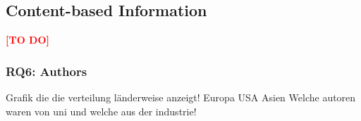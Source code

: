 
\subsection{Content-based Information}
\label{subsec:ContentBasedInformation}
\textcolor{red}{\textbf{[TO DO]}}


\clearpage
\subsubsection{RQ6: Authors}

Grafik die die verteilung länderweise anzeigt! Europa USA Asien
Welche autoren waren von uni und welche aus der industrie!

